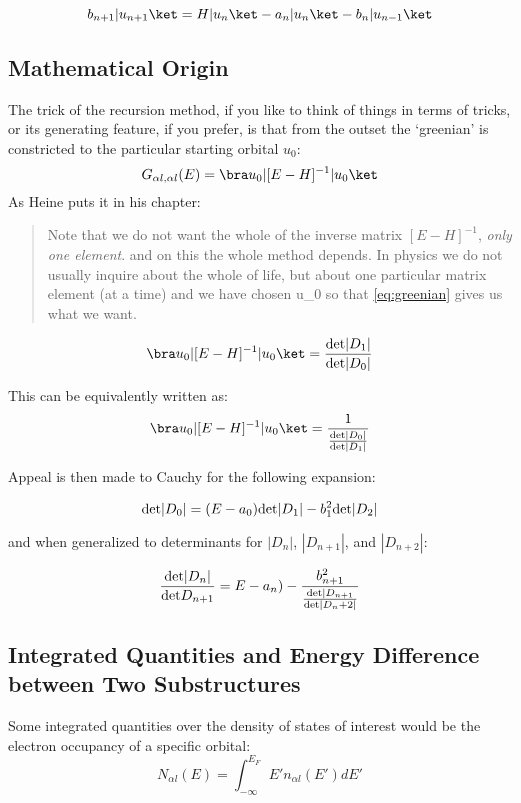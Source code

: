\begin{equation}
b_{n+1}|u_{n+1}\ket = H |u_{n}\ket - a_{n}|u_{n}\ket - b_{n}|u_{n-1}\ket
\end{equation}

\subsection{Mathematical Origin}
The trick of the recursion method, if you like to think of things in terms of tricks, 
or its generating feature, if you prefer, is that from the outset the `greenian' is constricted
to the particular starting orbital $u_{0}$: 
%
\begin{equation}
G_{\alpha l, \alpha l}(E) = \bra u_{0}|[E-H]^{-1}|u_{0}\ket 
\end{equation}
%
As Heine puts it in his chapter:
%
\begin{quote}
Note that we do not want the whole of the inverse matrix $[E-H]^{-1}$, 
\emph{only one element}. and on this the whole method depends. In physics we do not
usually inquire about the whole of life, but about one particular matrix element (at a time) and we have chosen
u_{0} so that \ref{eq:greenian} gives us what we want.
\end{quote}

%
\begin{equation}
\bra u_{0}|[E-H]^{-1}|u_{0}\ket = \frac{{\rm det}|D_{1}|}{{\rm det}|D_{0}|}
\end{equation}
%

This can be equivalently written as:
\begin{equation}
\bra u_{0}|[E-H]^{-1}|u_{0}\ket = \frac{1}{\frac{{\rm det}|D_{0}|}{{\rm det}|D_{1}|}}
\end{equation}

Appeal is then made to Cauchy for the following expansion:

\begin{equation}
{\rm det}|D_{0}| = (E-a_{0}){\rm det}|D_{1}| - b^{2}_{1}{\rm det}|D_{2}|
\end{equation}

and when generalized to determinants for $|D_{n}|$, $|D_{n+1}|$, and $|D_{n+2}|$:

\begin{equation}
\frac{{\rm det}|D_{n}|}{{\rm det} D_{n+1}} = E-a_{n}) - \frac{b^{2}_{n+1}}{\frac{{\rm det}|D_{n+1}}{{\rm det}|D_n+2|}}
\end{equation}

\subsection{Integrated Quantities and Energy Difference between Two Substructures}
Some integrated quantities over the density of states of interest would be
the electron occupancy of a specific orbital:
%
\begin{equation}
N_{\alpha l}(E) = \int_{-\infty}^{E_{F}}E' n_{\alpha l}(E') dE'
\end{equation}

